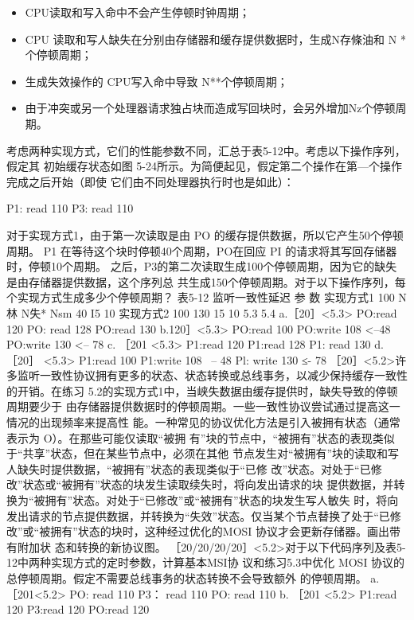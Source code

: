 \begin{itemize}
    \item CPU读取和写入命中不会产生停顿时钟周期；
    \item CPU 读取和写人缺失在分别由存储器和缓存提供数据时，生成N存條油和 N *个停顿周期；
    \item 生成失效操作的 CPU写入命中导致 N**个停顿周期；
    \item 由于冲突或另一个处理器请求独占块而造成写回块时，会另外增加Nz个停顿周期。
\end{itemize}
考虑两种实现方式，它们的性能参数不同，汇总于表5-12中。考虑以下操作序列，假定其
初始缓存状态如图 5-24所示。为简便起见，假定第二个操作在第—个操作完成之后开始（即使
它们由不同处理器执行时也是如此）：

P1: read 110
P3: read 110

对于实现方式1，由于第一次读取是由 PO 的缓存提供数据，所以它产生50个停顿周期。
P1 在等待这个块时停顿40个周期，PO在回应 PI 的请求将其写回存储器时，停顿10个周期。
之后，P3的第二次读取生成100个停顿周期，因为它的缺失是由存储器提供数据，这个序列总
共生成150个停顿周期。对于以下操作序列，每个实现方式生成多少个停顿周期？
表5-12 监听一致性延迟
参
数
实现方式1
100
N 林
N失*
Nsm
40
I5
10
实现方式2
100
130
15
10
5.3
5.4
a.［20］<5.3>
PO:read 120
PO: read 128
PO:read 130
b.120］<5.3>
PO:read 100
PO:write 108 <--48
PO:write 130 <-- 78
c. ［201 <5.3>
P1:read 120
P1:read 128
P1: read 130
d. ［20］ <5.3>
P1:read 100
P1:write
108 ~-- 48
Pl: write 130
≤- 78
［20］<5.2>许多监听一致性协议拥有更多的状态、状态转换或总线事务，以减少保持缓存一致性
的开销。在练习 5.2的实现方式1中，当峡失数据由缓存提供时，缺失导致的停顿周期要少于
由存储器提供数据时的停顿周期。一些一致性协议尝试通过提高这一情况的出现频率来提高性
能。一种常见的协议优化方法是引入被拥有状态（通常表示为 O）。在那些可能仅读取“被拥
有”块的节点中，“被拥有”状态的表现类似于“共享”状态，但在某些节点中，必须在其他
节点发生对“被拥有”块的读取和写人缺失时提供数据，“被拥有”状态的表现类似于“已修
改”状态。对处于“已修改”状态或“被拥有”状态的块发生读取续失时，将向发出请求的块
提供数据，并转换为“被拥有”状态。对处于“已修改”或“被拥有”状态的块发生写人敏失
时，将向发出请求的节点提供数据，并转换为“失效”状态。仅当某个节点替换了处于“已修
改”或“被拥有”状态的块时，这种经过优化的MOSI 协议才会更新存储器。画出带有附加状
态和转换的新协议图。
［20/20/20/20］<5.2>对于以下代码序列及表5-12中两种实现方式的定时参数，计算基本MSI协
议和练习5.3中优化 MOSI 协议的总停顿周期。假定不需要总线事务的状态转换不会导致额外
的停顿周期。
a. ［201<5.2>
PO: read 110
P3：
read 110
PO: read 110
b. ［201 <5.2>
P1:read 120
P3:read 120
PO:read 120

